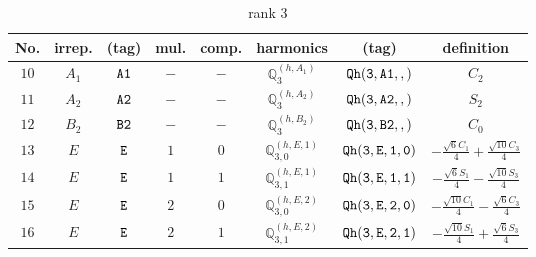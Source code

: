 \documentclass[fleqn,8pt]{jsarticle}
\begin{document}
\begin{table}[ht!]
\begin{center}
\caption{rank 3}
\renewcommand{\arraystretch}{1.3}
\begin{tabular}{cccccccc} \hline \hline
No. & irrep. & (tag) & mul. & comp. & harmonics & (tag) & definition \\ \hline
$ 10 $ & $ A_{1} $ & $ {\tt A1} $ & $ - $ & $ - $ & $ \mathbb{Q}_{3}^{(h,A_{1})} $ & $ {\tt Qh(3,A1,,)} $ & $ C_{2} $ \\
$ 11 $ & $ A_{2} $ & $ {\tt A2} $ & $ - $ & $ - $ & $ \mathbb{Q}_{3}^{(h,A_{2})} $ & $ {\tt Qh(3,A2,,)} $ & $ S_{2} $ \\
$ 12 $ & $ B_{2} $ & $ {\tt B2} $ & $ - $ & $ - $ & $ \mathbb{Q}_{3}^{(h,B_{2})} $ & $ {\tt Qh(3,B2,,)} $ & $ C_{0} $ \\
$ 13 $ & $ E $ & $ {\tt E} $ & $ 1 $ & $ 0 $ & $ \mathbb{Q}_{3,0}^{(h,E,1)} $ & $ {\tt Qh(3,E,1,0)} $ & $ - \frac{\sqrt{6} C_{1}}{4} + \frac{\sqrt{10} C_{3}}{4} $ \\
$ 14 $ & $ E $ & $ {\tt E} $ & $ 1 $ & $ 1 $ & $ \mathbb{Q}_{3,1}^{(h,E,1)} $ & $ {\tt Qh(3,E,1,1)} $ & $ - \frac{\sqrt{6} S_{1}}{4} - \frac{\sqrt{10} S_{3}}{4} $ \\
$ 15 $ & $ E $ & $ {\tt E} $ & $ 2 $ & $ 0 $ & $ \mathbb{Q}_{3,0}^{(h,E,2)} $ & $ {\tt Qh(3,E,2,0)} $ & $ - \frac{\sqrt{10} C_{1}}{4} - \frac{\sqrt{6} C_{3}}{4} $ \\
$ 16 $ & $ E $ & $ {\tt E} $ & $ 2 $ & $ 1 $ & $ \mathbb{Q}_{3,1}^{(h,E,2)} $ & $ {\tt Qh(3,E,2,1)} $ & $ - \frac{\sqrt{10} S_{1}}{4} + \frac{\sqrt{6} S_{3}}{4} $ \\
 \hline \hline
\end{tabular}
\end{center}
\end{table}
\end{document}

